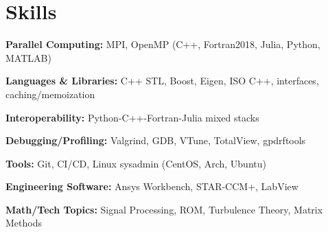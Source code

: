 \documentclass[letterpaper,11pt]{article}
\begin{document}
\section{Skills}
 \begin{itemize}[leftmargin=0.15in, label={}]
    \small{
    \item{\textbf{Parallel Computing:} MPI, OpenMP (C++, Fortran2018, Julia, Python, MATLAB)}
    \item{\textbf{Languages \& Libraries:} C++ STL, Boost, Eigen, ISO C++, interfaces, caching/memoization}
    \item{\textbf{Interoperability:} Python-C++-Fortran-Julia mixed stacks}
    \item{\textbf{Debugging/Profiling:} Valgrind, GDB, VTune, TotalView, gpdrftools}
    \item{\textbf{Tools:} Git, CI/CD, Linux sysadmin (CentOS, Arch, Ubuntu)}
    \item{\textbf{Engineering Software:} Ansys Workbench, STAR-CCM+, LabView}
    \item{\textbf{Math/Tech Topics:} Signal Processing, ROM, Turbulence Theory, Matrix Methods}
    }
 \end{itemize}
\end{document}
